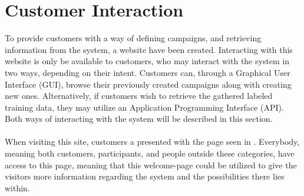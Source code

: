 
\section{Customer Interaction}
\label{sec:customer_interaction}

To provide customers with a way of defining campaigns, and retrieving information from the system, a website have been created. Interacting with this website is only be available to customers, who may interact with the system in two ways, depending on their intent.  Customers can, through a Graphical User Interface (GUI), browse their previously created campaigns along with creating new ones. Alternatively, if customers wish to retrieve the gathered labeled training data, they may utilize an Application Programming Interface (API). Both ways of interacting with the system will be described in this section.
\\\\
When visiting this site, customers a presented with the page seen in . Everybody, meaning both customers, participants, and people outside these categories, have access to this page, meaning that this welcome-page could be utilized to give the visitors more information regarding the system and the possibilities there lies within. 



 



